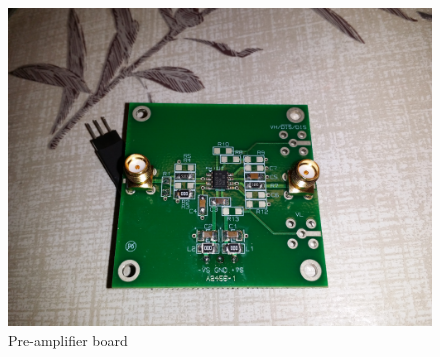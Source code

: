 \documentclass[a4paper]{article}
\begin{document}
\begin{appendices}
\begin{figure}[ht!]
\centering
\includegraphics[width=\textwidth]{fig/IMG_20201207_121010.jpg}
\caption{Pre-amplifier board}
\end{figure}



\end{appendices}
\end{document}
